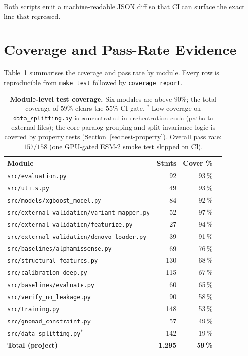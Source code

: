 \documentclass[11pt,a4paper,oneside]{report}
\begin{document}
Both scripts emit a machine-readable JSON diff so that CI
can surface the exact line that regressed.

\section{Coverage and Pass-Rate Evidence}
\label{sec:test-coverage}

Table~\ref{tab:coverage} summarises the coverage and pass
rate by module. Every row is reproducible from
\texttt{make test} followed by \texttt{coverage report}.

\begin{table}[htbp]
\centering
\footnotesize
\begin{tabularx}{\linewidth}{@{}X r r r@{}}
\toprule
\textbf{Module} & \textbf{Stmts} & \textbf{Cover \%} \\
\midrule
\texttt{src/evaluation.py}                  &  92 & 93\,\% \\
\texttt{src/utils.py}                       &  49 & 93\,\% \\
\texttt{src/models/xgboost\_model.py}       &  84 & 92\,\% \\
\texttt{src/external\_validation/variant\_mapper.py} &  52 & 97\,\% \\
\texttt{src/external\_validation/featurize.py} &  27 & 94\,\% \\
\texttt{src/external\_validation/denovo\_loader.py} &  39 & 91\,\% \\
\texttt{src/baselines/alphamissense.py}     &  69 & 76\,\% \\
\texttt{src/structural\_features.py}        & 130 & 68\,\% \\
\texttt{src/calibration\_deep.py}           & 115 & 67\,\% \\
\texttt{src/baselines/evaluate.py}          &  60 & 65\,\% \\
\texttt{src/verify\_no\_leakage.py}         &  90 & 58\,\% \\
\texttt{src/training.py}                    & 148 & 53\,\% \\
\texttt{src/gnomad\_constraint.py}          &  57 & 49\,\% \\
\texttt{src/data\_splitting.py}$^{*}$       & 142 & 19\,\% \\
\midrule
\textbf{Total (project)}                    & \textbf{1{,}295} & \textbf{59\,\%} \\
\bottomrule
\end{tabularx}
\caption[Module-level test coverage]{\textbf{Module-level
test coverage.} Six modules are above $90\%$; the total
coverage of $59\%$ clears the $55\%$ CI gate. $^{*}$ Low
coverage on \texttt{data\_splitting.py} is concentrated in
orchestration code (paths to external files); the core
paralog-grouping and split-invariance logic is covered by
property tests (Section~\ref{sec:test-property}). Overall
pass rate: $157/158$ (one GPU-gated ESM-2 smoke test skipped
on CI).}
\label{tab:coverage}
\end{table}
\end{document}
